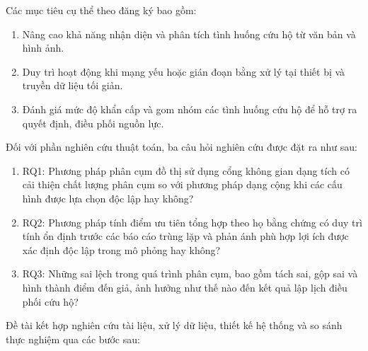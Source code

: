 Các mục tiêu cụ thể theo đăng ký bao gồm:

\begin{enumerate}
    \item Nâng cao khả năng nhận diện và phân tích tình huống cứu hộ từ văn bản và hình ảnh.
    \item Duy trì hoạt động khi mạng yếu hoặc gián đoạn bằng xử lý tại thiết bị và truyền dữ liệu tối giản.
    \item Đánh giá mức độ khẩn cấp và gom nhóm các tình huống cứu hộ để hỗ trợ ra quyết định, điều phối nguồn lực.
\end{enumerate}

Đối với phần nghiên cứu thuật toán, ba câu hỏi nghiên cứu được đặt ra như sau:

\begin{enumerate}
    \item RQ1: Phương pháp phân cụm đồ thị sử dụng cổng không gian dạng tích có cải thiện chất lượng phân cụm so với phương pháp dạng cộng khi các cấu hình được lựa chọn độc lập hay không?
    \item RQ2: Phương pháp tính điểm ưu tiên tổng hợp theo họ bằng chứng có duy trì tính ổn định trước các báo cáo trùng lặp và phản ánh phù hợp lợi ích được xác định độc lập trong mô phỏng hay không?
    \item RQ3: Những sai lệch trong quá trình phân cụm, bao gồm tách sai, gộp sai và hình thành điểm đến giả, ảnh hưởng như thế nào đến kết quả lập lịch điều phối cứu hộ?
\end{enumerate}



Đề tài kết hợp nghiên cứu tài liệu, xử lý dữ liệu, thiết kế hệ thống và so sánh thực nghiệm qua các bước sau:

